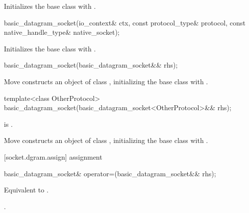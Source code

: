 \begin{itemdescr}
\pnum
\effects Initializes the base class with .
\end{itemdescr}

\begin{itemdecl}
basic_datagram_socket(io_context& ctx, const protocol_type& protocol,
                      const native_handle_type& native_socket);
\end{itemdecl}

\begin{itemdescr}
\pnum
\effects Initializes the base class with .
\end{itemdescr}

\begin{itemdecl}
basic_datagram_socket(basic_datagram_socket&& rhs);
\end{itemdecl}

\begin{itemdescr}
\pnum
\effects Move constructs an object of class , initializing the base class with .
\end{itemdescr}

\begin{itemdecl}
template<class OtherProtocol>
  basic_datagram_socket(basic_datagram_socket<OtherProtocol>&& rhs);
\end{itemdecl}

\begin{itemdescr}
\pnum
\constraints {} is .

\pnum
\effects Move constructs an object of class , initializing the base class with .
\end{itemdescr}



[socket.dgram.assign]{ assignment}

\begin{itemdecl}
basic_datagram_socket& operator=(basic_datagram_socket&& rhs);
\end{itemdecl}

\begin{itemdescr}
\pnum
\effects Equivalent to .

\pnum
\returns {}.
\end{itemdescr}

